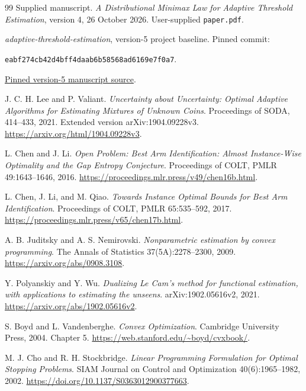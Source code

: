 \documentclass[11pt,a4paper]{article}
\theoremstyle{definition}
\theoremstyle{remark}
\newcommand{\1}{\mathbf 1}
\begin{document}







\clearpage
\begin{thebibliography}{99}
Supplied manuscript. \emph{A Distributional Minimax Law for Adaptive
Threshold Estimation}, version 4, 26 October 2026.
User-supplied \texttt{paper.pdf}.

{\raggedright
\emph{adaptive-threshold-estimation}, version-5 project baseline.
Pinned commit:\par
\texttt{eabf274cb42d4bff4daab6b58568ad6169e7f0a7}.\par
\href{https://github.com/davidiach/adaptive-threshold-estimation/tree/eabf274cb42d4bff4daab6b58568ad6169e7f0a7/paper/v5}{Pinned version-5 manuscript source}.\par}

J. C. H. Lee and P. Valiant.
\emph{Uncertainty about Uncertainty: Optimal Adaptive Algorithms for
Estimating Mixtures of Unknown Coins}.
Proceedings of SODA, 414--433, 2021.
Extended version arXiv:1904.09228v3.
\url{https://arxiv.org/html/1904.09228v3}.

L. Chen and J. Li.
\emph{Open Problem: Best Arm Identification: Almost Instance-Wise
Optimality and the Gap Entropy Conjecture}.
Proceedings of COLT, PMLR 49:1643--1646, 2016.
\url{https://proceedings.mlr.press/v49/chen16b.html}.

L. Chen, J. Li, and M. Qiao.
\emph{Towards Instance Optimal Bounds for Best Arm Identification}.
Proceedings of COLT, PMLR 65:535--592, 2017.
\url{https://proceedings.mlr.press/v65/chen17b.html}.

A. B. Juditsky and A. S. Nemirovski.
\emph{Nonparametric estimation by convex programming}.
The Annals of Statistics 37(5A):2278--2300, 2009.
\url{https://arxiv.org/abs/0908.3108}.

Y. Polyanskiy and Y. Wu.
\emph{Dualizing Le Cam's method for functional estimation, with applications
to estimating the unseens}. arXiv:1902.05616v2, 2021.
\url{https://arxiv.org/abs/1902.05616v2}.

S. Boyd and L. Vandenberghe. \emph{Convex Optimization}.
Cambridge University Press, 2004. Chapter 5.
\url{https://web.stanford.edu/~boyd/cvxbook/}.

M. J. Cho and R. H. Stockbridge.
\emph{Linear Programming Formulation for Optimal Stopping Problems}.
SIAM Journal on Control and Optimization 40(6):1965--1982, 2002.
\url{https://doi.org/10.1137/S0363012900377663}.


\end{thebibliography}
\end{document}
